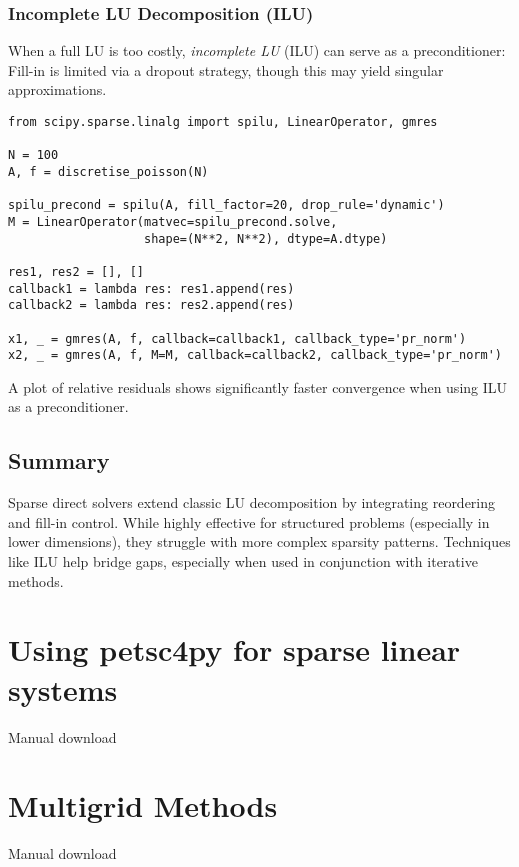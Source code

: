 \documentclass[11pt,a4paper]{book}
\begin{document}
\subsection*{Incomplete LU Decomposition (ILU)}
When a full LU is too costly, \emph{incomplete LU} (ILU) can serve as a preconditioner:  
Fill-in is limited via a dropout strategy, though this may yield singular approximations.

\begin{lstlisting}
from scipy.sparse.linalg import spilu, LinearOperator, gmres

N = 100
A, f = discretise_poisson(N)

spilu_precond = spilu(A, fill_factor=20, drop_rule='dynamic')
M = LinearOperator(matvec=spilu_precond.solve,
                   shape=(N**2, N**2), dtype=A.dtype)

res1, res2 = [], []
callback1 = lambda res: res1.append(res)
callback2 = lambda res: res2.append(res)

x1, _ = gmres(A, f, callback=callback1, callback_type='pr_norm')
x2, _ = gmres(A, f, M=M, callback=callback2, callback_type='pr_norm')
\end{lstlisting}

A plot of relative residuals shows significantly faster convergence when using ILU as a preconditioner.

\section*{Summary}

Sparse direct solvers extend classic LU decomposition by integrating reordering and fill-in control. While highly effective for structured problems (especially in lower dimensions), they struggle with more complex sparsity patterns. Techniques like ILU help bridge gaps, especially when used in conjunction with iterative methods.

\chapter{Using petsc4py for sparse linear systems}

Manual download

\chapter{Multigrid Methods}

Manual download
\end{document}
